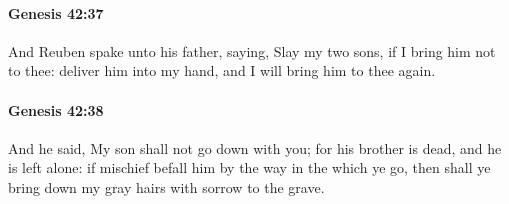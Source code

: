 		\paragraph{Genesis 42:37} %
			\label{GENESIS-42-37}

			And Reuben spake unto his father, saying, Slay my two sons, if I bring him not to thee: deliver him into my hand, and I will bring him to thee again.


		\paragraph{Genesis 42:38} %
			\label{GENESIS-42-38}

			And he said, My son shall not go down with you; for his brother is dead, and he is left alone: if mischief befall him by the way in the which ye go, then shall ye bring down my gray hairs with sorrow to the grave.

